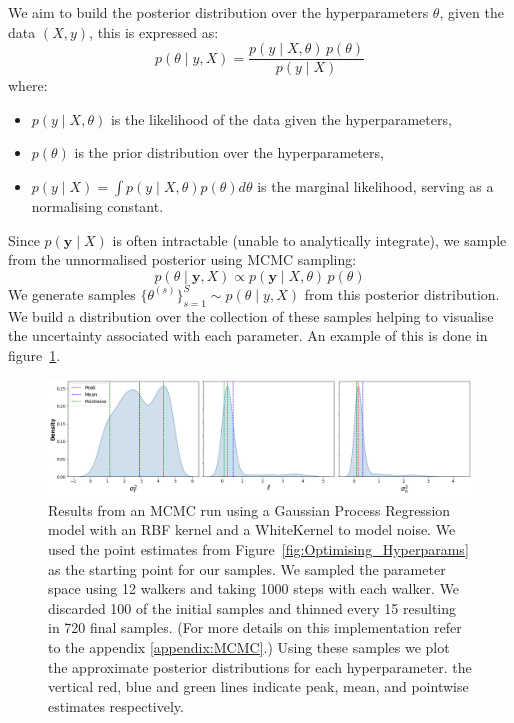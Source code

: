 \documentclass{ucdgradtaughtthesis}
\begin{document}
We aim to build the posterior distribution over the hyperparameters \( \theta \), given the data \((X, y)\), this is expressed as:
%
\begin{equation}
p(\theta \mid y, X) = \frac{p(y \mid X, \theta) \, p(\theta)}{p(y \mid X)}
\end{equation}
where:
\begin{itemize}
    \item \( p(y \mid X, \theta) \) is the likelihood of the data given the hyperparameters,
    \item \( p(\theta) \) is the prior distribution over the hyperparameters,
    \item \( p(y \mid X) = \int p(y \mid X,\theta)p(\theta)d\theta \) is the marginal likelihood, serving as a normalising constant.
\end{itemize}
Since \( p(\mathbf{y} \mid X) \) is often intractable (unable to analytically integrate), we sample from the unnormalised posterior using MCMC sampling:
\begin{equation}
p(\theta \mid \mathbf{y}, X) \propto p(\mathbf{y} \mid X, \theta) \, p(\theta)
\end{equation}
%
We generate samples \( \{\theta^{(s)}\}_{s=1}^S \sim p(\theta \mid y, X) \) from this posterior distribution.
We build a distribution over the collection of these samples helping to visualise the uncertainty associated with each parameter. 
An example of this is done in figure~\ref{fig:MCMCresults}.
\begin{figure}[H]
    \centering
    \includegraphics[width=\textwidth]{LatexPlots/1dplots/MCMCdistribution.png}
    \caption[Visualising the posterior distribution of the hyperparameters using MCMC.]{
    Results from an MCMC run using a Gaussian Process Regression model with an RBF kernel and a WhiteKernel to model noise. We used the point estimates from Figure~\ref{fig:Optimising_Hyperparams} as the starting point 
    for our samples. We sampled the parameter space using 12 walkers and taking 1000 steps with each walker. We discarded 100 of the initial samples and thinned every 15 resulting in 720 final samples. 
    (For more details on this implementation refer to the appendix \ref{appendix:MCMC}.)
    Using these samples we plot the approximate posterior distributions for each hyperparameter. 
    the vertical red, blue and green lines indicate peak, mean, and pointwise estimates respectively.}
    \label{fig:MCMCresults}
\end{figure}
%
\end{document}
